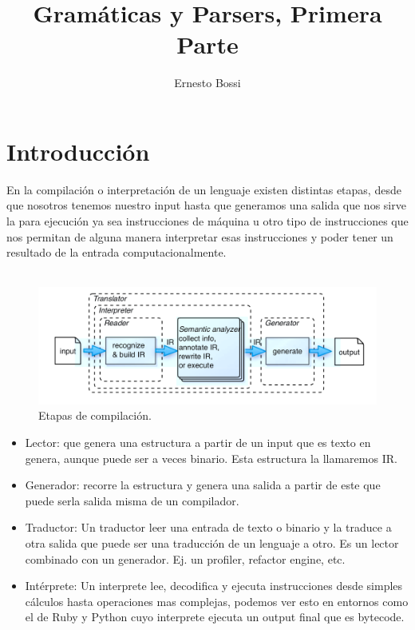 \documentclass[fleqn]{tcdl}
\title{Gramáticas y Parsers, Primera Parte}
\author[1]{Ernesto Bossi}
\affil[1]{Profesor}
\begin{document}
\flushbottom
\maketitle
\thispagestyle{empty}

\section*{Introducción}
\fontsize{11}{14}\selectfont

En la compilación o interpretación de un lenguaje existen distintas etapas, desde que nosotros tenemos nuestro input hasta que generamos una salida que nos sirve la para ejecución ya sea instrucciones de máquina u otro tipo de instrucciones que nos permitan de alguna manera interpretar esas instrucciones y poder tener un resultado de la entrada computacionalmente.
\\\\

\begin{figure}[h]
\captionsetup{type=figure}
\includegraphics[width=\textwidth]{etapas.png}
\caption{\label{fig:comp_basic}Etapas de compilación.}
\end{figure}

\begin{itemize}
\item Lector: que genera una estructura a partir de un input que es texto en genera, aunque puede ser a veces binario. Esta estructura la llamaremos IR.
\item Generador: recorre la estructura y genera una salida a partir de este que puede serla salida misma de un compilador.
\item Traductor: Un traductor leer una entrada de texto o binario y la traduce a otra salida que puede ser una traducción de un lenguaje a otro. Es un lector combinado con un generador. Ej. un profiler, refactor engine, etc.
\item Intérprete: Un interprete lee, decodifica y ejecuta instrucciones desde simples cálculos hasta operaciones mas complejas, podemos ver esto en entornos como el de Ruby y Python cuyo interprete ejecuta un output final que es bytecode.
\end{itemize}
\end{document}

